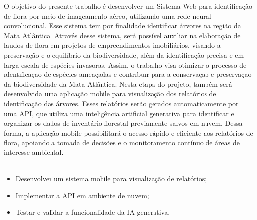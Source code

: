 O objetivo do presente trabalho é desenvolver um Sistema Web para identificação de flora por meio de imageamento aéreo, utilizando uma rede neural convolucional. Esse sistema tem por finalidade identificar árvores na região da Mata Atlântica. Através desse sistema, será possível auxiliar na elaboração de laudos de flora em projetos de empreendimentos imobiliários, visando a preservação e o equilíbrio da biodiversidade, além da identificação precisa e em larga escala de espécies invasoras. Assim, o trabalho visa otimizar o processo de identificação de espécies ameaçadas e contribuir para a conservação e preservação da biodiversidade da Mata Atlântica.
Nesta etapa do projeto, também será desenvolvida uma aplicação mobile para visualização dos relatórios de identificação das árvores. Esses relatórios serão gerados automaticamente por uma API, que utiliza uma inteligência artificial generativa para identificar e organizar os dados de inventário florestal previamente salvos em nuvem. Dessa forma, a aplicação mobile possibilitará o acesso rápido e eficiente aos relatórios de flora, apoiando a tomada de decisões e o monitoramento contínuo de áreas de interesse ambiental.\\
\
\begin{itemize}
\item Desenvolver um sistema mobile para visualização de relatórios;
\item Implementar a API em ambiente de nuvem;
\item Testar e validar a funcionalidade da IA generativa.
\end{itemize}